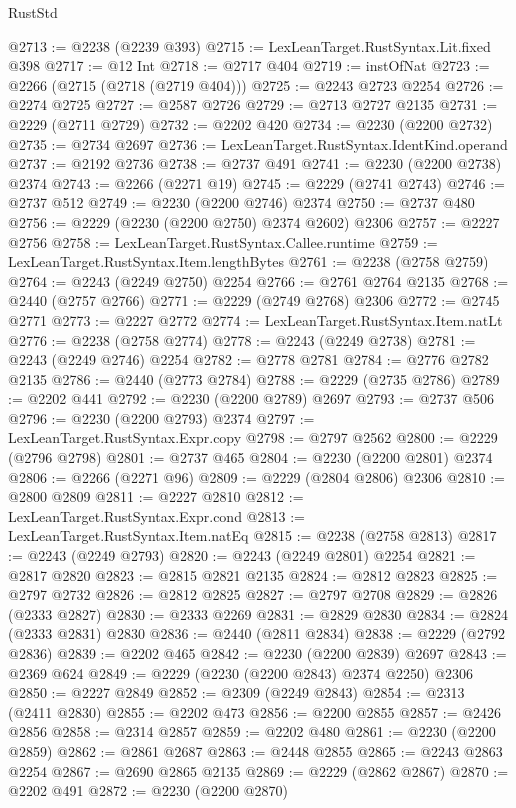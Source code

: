 \begin{lexlean}{RustStd}
\begin{coremodule}
@2713 := @2238 (@2239 @393)
@2715 := LexLeanTarget.RustSyntax.Lit.fixed @398
@2717 := @12 Int
@2718 := @2717 @404
@2719 := instOfNat
@2723 := @2266 (@2715 (@2718 (@2719 @404)))
@2725 := @2243 @2723 @2254
@2726 := @2274 @2725
@2727 := @2587 @2726
@2729 := @2713 @2727 @2135
@2731 := @2229 (@2711 @2729)
@2732 := @2202 @420
@2734 := @2230 (@2200 @2732)
@2735 := @2734 @2697
@2736 := LexLeanTarget.RustSyntax.IdentKind.operand
@2737 := @2192 @2736
@2738 := @2737 @491
@2741 := @2230 (@2200 @2738) @2374
@2743 := @2266 (@2271 @19)
@2745 := @2229 (@2741 @2743)
@2746 := @2737 @512
@2749 := @2230 (@2200 @2746) @2374
@2750 := @2737 @480
@2756 := @2229 (@2230 (@2200 @2750) @2374 @2602) @2306
@2757 := @2227 @2756
@2758 := LexLeanTarget.RustSyntax.Callee.runtime
@2759 := LexLeanTarget.RustSyntax.Item.lengthBytes
@2761 := @2238 (@2758 @2759)
@2764 := @2243 (@2249 @2750) @2254
@2766 := @2761 @2764 @2135
@2768 := @2440 (@2757 @2766)
@2771 := @2229 (@2749 @2768) @2306
@2772 := @2745 @2771
@2773 := @2227 @2772
@2774 := LexLeanTarget.RustSyntax.Item.natLt
@2776 := @2238 (@2758 @2774)
@2778 := @2243 (@2249 @2738)
@2781 := @2243 (@2249 @2746) @2254
@2782 := @2778 @2781
@2784 := @2776 @2782 @2135
@2786 := @2440 (@2773 @2784)
@2788 := @2229 (@2735 @2786)
@2789 := @2202 @441
@2792 := @2230 (@2200 @2789) @2697
@2793 := @2737 @506
@2796 := @2230 (@2200 @2793) @2374
@2797 := LexLeanTarget.RustSyntax.Expr.copy
@2798 := @2797 @2562
@2800 := @2229 (@2796 @2798)
@2801 := @2737 @465
@2804 := @2230 (@2200 @2801) @2374
@2806 := @2266 (@2271 @96)
@2809 := @2229 (@2804 @2806) @2306
@2810 := @2800 @2809
@2811 := @2227 @2810
@2812 := LexLeanTarget.RustSyntax.Expr.cond
@2813 := LexLeanTarget.RustSyntax.Item.natEq
@2815 := @2238 (@2758 @2813)
@2817 := @2243 (@2249 @2793)
@2820 := @2243 (@2249 @2801) @2254
@2821 := @2817 @2820
@2823 := @2815 @2821 @2135
@2824 := @2812 @2823
@2825 := @2797 @2732
@2826 := @2812 @2825
@2827 := @2797 @2708
@2829 := @2826 (@2333 @2827)
@2830 := @2333 @2269
@2831 := @2829 @2830
@2834 := @2824 (@2333 @2831) @2830
@2836 := @2440 (@2811 @2834)
@2838 := @2229 (@2792 @2836)
@2839 := @2202 @465
@2842 := @2230 (@2200 @2839) @2697
@2843 := @2369 @624
@2849 := @2229 (@2230 (@2200 @2843) @2374 @2250) @2306
@2850 := @2227 @2849
@2852 := @2309 (@2249 @2843)
@2854 := @2313 (@2411 @2830)
@2855 := @2202 @473
@2856 := @2200 @2855
@2857 := @2426 @2856
@2858 := @2314 @2857
@2859 := @2202 @480
@2861 := @2230 (@2200 @2859)
@2862 := @2861 @2687
@2863 := @2448 @2855
@2865 := @2243 @2863 @2254
@2867 := @2690 @2865 @2135
@2869 := @2229 (@2862 @2867)
@2870 := @2202 @491
@2872 := @2230 (@2200 @2870)

\end{coremodule}
\end{lexlean}

